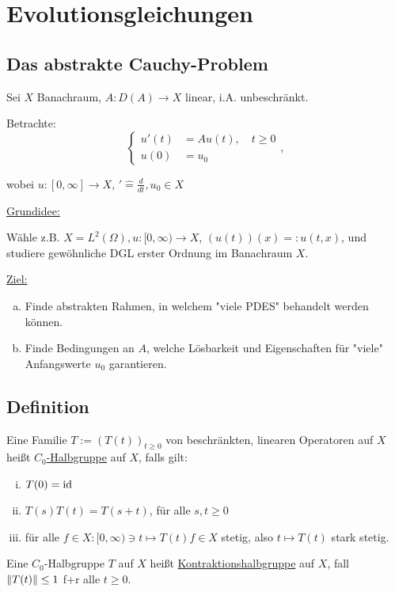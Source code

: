 \section{Evolutionsgleichungen}

\subsection{Das abstrakte Cauchy-Problem}

Sei $X$ Banachraum, $A \colon D(A) \to X$ linear, i.A. unbeschränkt.

Betrachte:
$$
\begin{cases} 
u'(t) &= Au(t), \quad t \geq 0 \\
u(0) &= u_0
\end{cases} , $$

wobei $u \colon [0,\infty] \to X$, $' \hat = \frac{d}{dt}, u_0 \in X$

\underline{Grundidee:}

Wähle z.B. $X = L^2(\Omega), u \colon [0,\infty) \to X$, $(u(t))(x) =: u(t,x)$, und studiere gewöhnliche DGL erster Ordnung im Banachraum $X$.

\underline{Ziel:}

\begin{enumerate}[a)]
  \item Finde abstrakten Rahmen, in welchem "viele PDES" behandelt werden können.
  \item Finde Bedingungen an $A$, welche Lösbarkeit und Eigenschaften für "viele" Anfangswerte $u_0$ garantieren.
\end{enumerate}

\subsection{Definition}

Eine Familie $T := (T(t))_{t \geq 0}$ von beschränkten, linearen Operatoren auf $X$ heißt \underline{$C_0$-Halbgruppe} auf $X$, falls gilt:
\begin{enumerate}[i)]
  \item $T(0) = \operatorname{id}$
  \item $T(s)T(t) = T(s + t)$, für alle $s,t \geq 0$
  \item für alle $f \in X \colon [0,\infty) \ni t \mapsto T(t) f \in X$ stetig, also $t \mapsto T(t)$ stark stetig.
\end{enumerate}

Eine $C_0$-Halbgruppe $T$ auf $X$ heißt \underline{Kontraktionshalbgruppe} auf $X$, fall $\lVert T(t) \rVert \leq 1$ f+r alle $t \geq 0$.

